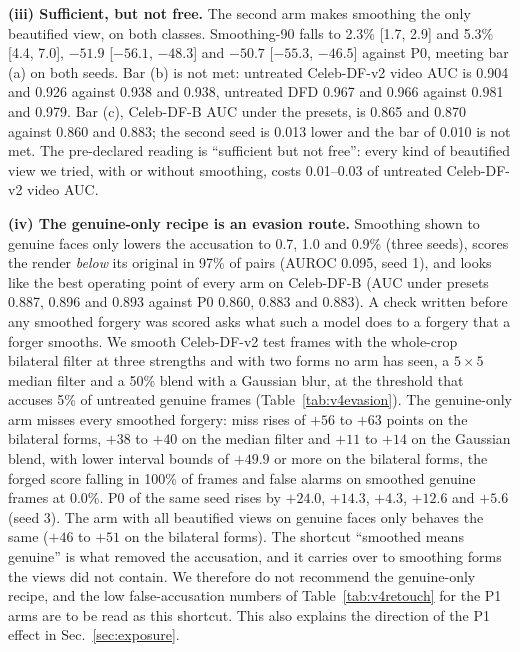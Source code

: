 \textbf{(iii) Sufficient, but not free.} The second arm makes smoothing the only beautified view, on both classes.
Smoothing-90 falls to 2.3\% [1.7, 2.9] and 5.3\% [4.4, 7.0], $-51.9$ [$-56.1$, $-48.3$] and $-50.7$ [$-55.3$, $-46.5$]
against P0, meeting bar (a) on both seeds. Bar (b) is not met: untreated Celeb-DF-v2 video AUC is 0.904 and 0.926 against
0.938 and 0.938, untreated DFD 0.967 and 0.966 against 0.981 and 0.979. Bar (c), Celeb-DF-B AUC under the presets, is
0.865 and 0.870 against 0.860 and 0.883; the second seed is 0.013 lower and the bar of 0.010 is not met. The
pre-declared reading is ``sufficient but not free'': every kind of beautified view we tried, with or without smoothing,
costs 0.01--0.03 of untreated Celeb-DF-v2 video AUC.

\textbf{(iv) The genuine-only recipe is an evasion route.} Smoothing shown to genuine faces only lowers the accusation
to 0.7, 1.0 and 0.9\% (three seeds), scores the render \emph{below} its original in 97\% of pairs (AUROC 0.095, seed 1),
and looks like the best operating point of every arm on Celeb-DF-B (AUC under presets 0.887, 0.896 and 0.893 against P0
0.860, 0.883 and 0.883). A check written before any smoothed forgery was scored asks what such a model does to a
forgery that a forger smooths. We smooth Celeb-DF-v2 test frames with the whole-crop bilateral filter at three
strengths and with two forms no arm has seen, a $5\times5$ median filter and a 50\% blend with a Gaussian blur, at the
threshold that accuses 5\% of untreated genuine frames (Table~\ref{tab:v4evasion}). The genuine-only arm misses every
smoothed forgery: miss rises of $+56$ to $+63$ points on the bilateral forms, $+38$ to $+40$ on the median filter and
$+11$ to $+14$ on the Gaussian blend, with lower interval bounds of $+49.9$ or more on the bilateral forms, the forged score falling in
100\% of frames and false alarms on smoothed genuine frames at 0.0\%. P0 of the same seed rises by $+24.0$, $+14.3$,
$+4.3$, $+12.6$ and $+5.6$ (seed 3). The arm with all beautified views on genuine faces only behaves the same ($+46$ to
$+51$ on the bilateral forms). The shortcut ``smoothed means genuine'' is what removed the accusation, and it carries
over to smoothing forms the views did not contain. We therefore do not recommend the genuine-only recipe, and the
low false-accusation numbers of Table~\ref{tab:v4retouch} for the P1 arms are to be read as this shortcut. This also
explains the direction of the P1 effect in Sec.~\ref{sec:exposure}.

